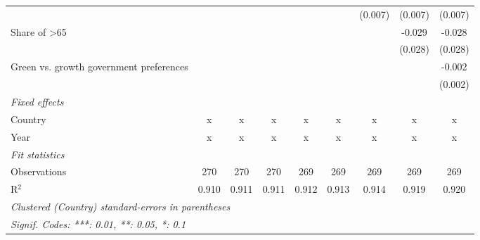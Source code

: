 \begin{table}[htbp]
\begin{tabular}{lcccccccc}
                                                    &         &         &         &         &         & (0.007) & (0.007) & (0.007)\\   
      Share of >65                                  &         &         &         &         &         &         & -0.029  & -0.028\\   
                                                    &         &         &         &         &         &         & (0.028) & (0.028)\\   
      Green vs. growth government preferences       &         &         &         &         &         &         &         & -0.002\\   
                                                    &         &         &         &         &         &         &         & (0.002)\\   
      \emph{Fixed effects}\\
      Country                                       & x       & x       & x       & x       & x       & x       & x       & x\\  
      Year                                          & x       & x       & x       & x       & x       & x       & x       & x\\  
      \midrule \emph{Fit statistics}\\
      Observations                                  & 270     & 270     & 270     & 269     & 269     & 269     & 269     & 269\\  
      R$^2$                                         & 0.910   & 0.911   & 0.911   & 0.912   & 0.913   & 0.914   & 0.919   & 0.920\\  
      \midrule
      \multicolumn{9}{l}{\emph{Clustered (Country) standard-errors in parentheses}}\\
      \multicolumn{9}{l}{\emph{Signif. Codes: ***: 0.01, **: 0.05, *: 0.1}}\\
   \end{tabular}
\end{table}


